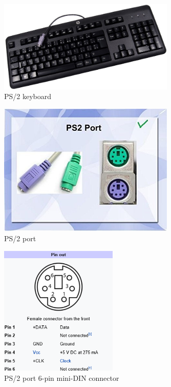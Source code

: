 \documentclass[12pt]{article}
\numberwithin{figure}{subsection}
\begin{document}
\begin{figure}
  \centering
  \includegraphics[width=0.75\textwidth]{ps2_keyboard.jpg}
  \caption{PS/2 keyboard}
  \label{fig:ps2_keyboard}
\end{figure}

\begin{figure}
  \centering
  \includegraphics[width=0.75\textwidth]{ps2_port.jpg}
  \caption{PS/2 port}
  \label{fig:ps2_port}
\end{figure}

\begin{figure}
  \centering
  \includegraphics[width=0.5\textwidth]{ps2_port_6_pin_mini_din_connector.png}
  \caption{PS/2 port 6-pin mini-DIN connector}
  \label{fig:ps2_port_6_pin_mini_din_connector}
\end{figure}
\end{document}
